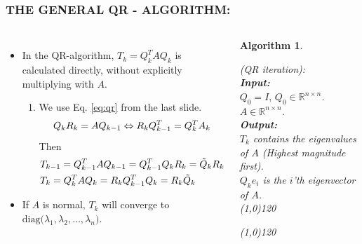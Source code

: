 \documentclass[a4paper,8pt]{beamer} %
\newcommand{\diag}[1]{\text{diag}{#1}}
\newtheorem{algo}{Algorithm}%
\begin{document}
\begin{frame}%
\frametitle{THE GENERAL QR - ALGORITHM:}
\begin{columns}
%
%
\column{7cm}
\begin{itemize}
\item
	In the QR-algorithm, $T_k=Q_k^TAQ_k$ is calculated directly, without explicitly multiplying with $A$.
	\begin{enumerate}
		\item[]
			We use Eq. \eqref{eq:qr} from the last slide.
			\begin{equation}
				Q_kR_k = AQ_{k-1} \Leftrightarrow R_kQ^T_{k-1} = Q_k^TA_k \notag\label{eq824_1} 
			\end{equation}
			Then
			\begin{align}
				&T_{k-1} = Q_{k-1}^T A Q_{k-1}  = Q_{k-1}^T Q_{k} R_{k} = \tilde Q_k R_k\label{eq824_2} \\
				&T_k = Q_k^T A Q_{k}  = R_k Q_{k-1}^T Q_{k} = R_k \tilde Q_k 	\notag\label{eq824_3} 
			\end{align}
	\end{enumerate}
\item If $A$ is normal, $T_k$ will converge to $\diag(\lambda_1,\lambda_2,\dots,\lambda_n)$.
\end{itemize}	

\column{5cm}
%
%
\begin{algo}
\begin{footnotesize}
{
%
	(QR iteration):
%
}\\
\textbf{Input: }
{
%
	\\$Q_0=I,\,Q_0\in\mathbb R^{n\times n}$.
	\\$A\in\mathbb R^{n\times n}$.
%
}\\
\textbf{Output: }
{
%
	\\$T_k$ contains the eigenvalues of $A$ (Highest magnitude first). 
	\\$Q_ke_i$ is the $i$'th eigenvector of $A$.
%
}\\
\line(1,0){120}
\begin{algorithmic}
%
\EndFor{}
%
\end{algorithmic}
\line(1,0){120}
\label{algQRIterSimple}
\end{footnotesize}
\end{algo}
%
%

\end{columns}
\end{frame} %
\end{document}
